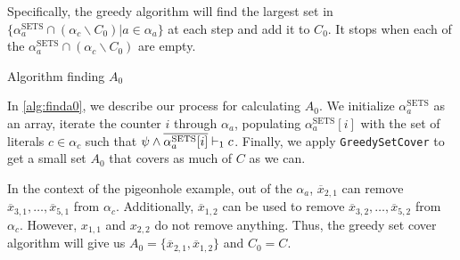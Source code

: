Specifically, the greedy algorithm will find the largest set in $\{\alpha_a^\mathrm{SETS} \cap (\alpha_c \backslash C_0) | a \in \alpha_a \}$ at each step and add it to $C_0$. It stops when each of the $\alpha_a^\mathrm{SETS} \cap (\alpha_c \backslash C_0)$ are empty.


\begin{algorithm}
    \caption{Algorithm finding $A_0$}\label{alg:finda0}
    \SetAlgoNoLine
\end{algorithm}

In \autoref{alg:finda0}, we describe our process for calculating $A_0$. 
We initialize $\alpha_a^\mathrm{SETS}$ as an array, iterate the counter
$i$ through $\alpha_a$, populating $\alpha_a^\mathrm{SETS}[i]$ with the set of literals
$c \in \alpha_c$ such that $\psi \land \overline{\alpha_a^\mathrm{SETS}[i]} \vdash_1 c$. Finally, we apply
\texttt{GreedySetCover} to get a small set $A_0$ that covers as much of $C$ as we can.

In the context of the pigeonhole example, out of the $\alpha_a$,
$\overline{x}_{2, 1}$ can remove $\overline{x}_{3, 1}, \ldots, \overline{x}_{5,
1}$ from $\alpha_c$. Additionally, $\overline{x}_{1, 2}$ can be used to remove
$\overline{x}_{3, 2}, \ldots, \overline{x}_{5, 2}$ from $\alpha_c$. However,
$x_{1, 1}$ and $x_{2, 2}$ do not remove anything. Thus, the greedy set cover
algorithm will give us $A_0 = \{\overline{x}_{2, 1}, \overline{x}_{1, 2}\}$ and
$C_0 = C$.




